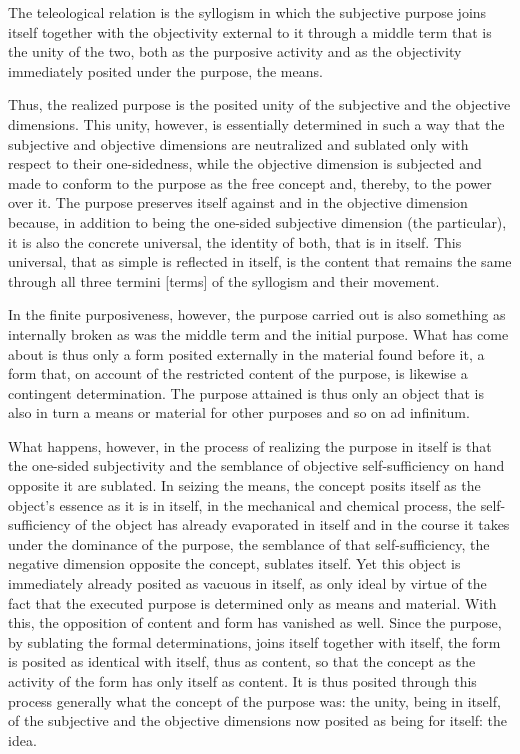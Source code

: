 The teleological relation is the syllogism
in which the subjective purpose joins itself
together with the objectivity external to it
through a middle term that is the unity of the two,
both as the purposive activity and as the objectivity
immediately posited under the purpose, the means.

Thus, the realized purpose is the posited unity of
the subjective and the objective dimensions.
This unity, however, is essentially determined in such a way that
the subjective and objective dimensions are neutralized
and sublated only with respect to their one-sidedness,
while the objective dimension is subjected
and made to conform to the purpose as the free concept
and, thereby, to the power over it.
The purpose preserves itself
against and in the objective dimension
because, in addition to being
the one-sided subjective dimension (the particular),
it is also the concrete universal,
the identity of both, that is in itself.
This universal, that as simple is reflected in itself,
is the content that remains the same
through all three termini [terms] of
the syllogism and their movement.

In the finite purposiveness, however,
the purpose carried out is also
something as internally broken
as was the middle term and the initial purpose.
What has come about is thus only a form
posited externally in the material found before it,
a form that, on account of the restricted content of
the purpose, is likewise a contingent determination.
The purpose attained is thus only an object
that is also in turn a means
or material for other purposes
and so on ad infinitum.

What happens, however, in the process of
realizing the purpose in itself is
that the one-sided subjectivity
and the semblance of objective self-sufficiency
on hand opposite it are sublated.
In seizing the means, the concept posits itself
as the object's essence as it is in itself,
in the mechanical and chemical process,
the self-sufficiency of the object
has already evaporated in itself
and in the course it takes under
the dominance of the purpose,
the semblance of that self-sufficiency,
the negative dimension opposite the concept,
sublates itself.
Yet this object is immediately
already posited as vacuous in itself,
as only ideal by virtue of the fact
that the executed purpose is determined
only as means and material.
With this, the opposition of content and form
has vanished as well.
Since the purpose, by sublating the formal determinations,
joins itself together with itself,
the form is posited as identical with itself,
thus as content,
so that the concept as the activity of
the form has only itself as content.
It is thus posited through this process generally
what the concept of the purpose was:
the unity, being in itself,
of the subjective and the objective dimensions
now posited as being for itself:
the idea.

